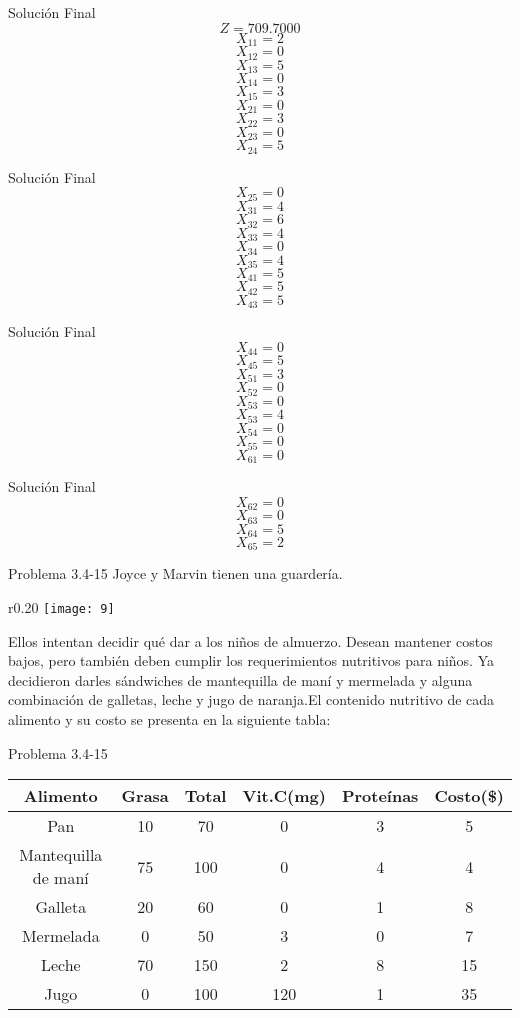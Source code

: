 \documentclass{beamer}
\begin{document}
\begin{frame}[fragile]{Solución Final}
\[Z = 709.7000 \]
\[X_{11} = 2\]
\[X_{12} = 0\]
\[X_{13} = 5\]
\[X_{14} = 0\]
\[X_{15} = 3\]
\[X_{21} = 0\]
\[X_{22} = 3\]
\[X_{23} = 0\]
\[X_{24} = 5\]
\end{frame}
\begin{frame}[fragile]{Solución Final}
\[X_{25} = 0\]
\[X_{31} = 4\]
\[X_{32} = 6\]
\[X_{33} = 4\]
\[X_{34} = 0\]
\[X_{35} = 4\]
\[X_{41} = 5\]
\[X_{42} = 5\]
\[X_{43} = 5\]
\end{frame}
\begin{frame}[fragile]{Solución Final}
\[X_{44} = 0\]
\[X_{45} = 5\]
\[X_{51} = 3\]
\[X_{52} = 0\]
\[X_{53} = 0\]
\[X_{53} = 4\]
\[X_{54} = 0\]
\[X_{55} = 0\]
\[X_{61} = 0\]
\end{frame}
\begin{frame}[fragile]{Solución Final}
\[X_{62} = 0\]
\[X_{63} = 0\]
\[X_{64} = 5\]
\[X_{65} = 2\]
\end{frame}

\begin{frame}[t,fragile]{Problema 3.4-15 }
Joyce y Marvin tienen una guardería. \begin{wrapfigure}{r}{0.20\textwidth}
    \centering
    \texttt{[image: 9]}
\end{wrapfigure} Ellos intentan decidir qué dar a los niños de almuerzo. Desean mantener costos bajos, pero también deben cumplir los requerimientos nutritivos para niños. Ya decidieron darles sándwiches de mantequilla de maní y mermelada  y alguna combinación de galletas, leche y jugo de naranja.El contenido nutritivo de cada alimento y su costo se presenta en la siguiente tabla:\\
\end{frame}
\begin{frame}[t,fragile]{Problema 3.4-15 }
\begin{tabular}{|c|c|c|c|c|c|}
\hline 
Alimento & Grasa & Total & Vit.C(mg) & Proteínas & Costo(\$) \\ 
\hline 
Pan& 10 & 70 & 0 & 3 & 5 \\ 
\hline 
Mantequilla de maní& 75 & 100 & 0 & 4 & 4 \\ 
\hline 
Galleta  & 20 & 60 & 0 & 1 & 8 \\ 
\hline 
Mermelada  & 0 & 50 & 3 & 0 & 7 \\ 
\hline 
Leche  & 70 & 150 & 2 & 8 & 15 \\ 
\hline 
Jugo  & 0 & 100 & 120 & 1 & 35 \\ 
\hline 
\end{tabular}
\end{frame}
\end{document}

